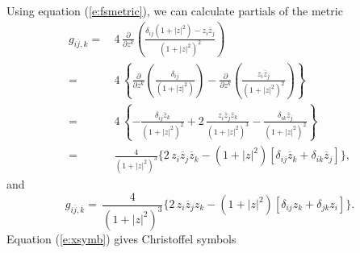 Using equation (\ref{e:fsmetric}), we can calculate partials of the metric 
\begin{equation}
\begin{split}
    g_{i\overline{j},k} =&\,4\, \frac{\partial}{\partial z^k} 
            \left(
                 \frac{\delta_{ij}\left( 1 + \left| z \right|^2 \right) - z_i\overline{z}_j }
                      { \left( 1 + \left| z\right|^2 \right)^2 }
            \right)\\
        =&\,4\, \left\lbrace
            \frac{\partial}{\partial z^k} \left(
                \frac{\delta_{ij}}{ \left( 1 + \left| z\right|^2 \right) }
            \right)
            - \frac{\partial}{\partial z^k} \left(
                \frac{z_i\overline{z}_j}{ 
                    \left( 1 + \left| z\right|^2 \right)^2 
                }
            \right)
        \right\rbrace\\
        =&\,4\,\left\lbrace
            -\frac{\delta_{ij}\overline{z}_k}{ 
                \left( 1 + \left| z\right|^2 \right)^2 
             }
            +2\,\frac{z_i\overline{z}_j\overline{z}_k}{
                    \left( 1 + \left| z\right|^2 \right)^3 
             }
            -\frac{\delta_{ik}\overline{z}_j}{ 
                \left( 1 + \left| z\right|^2 \right)^2 
             }
        \right\rbrace\\
        =&\,\frac{4}{
                \left( 1 + \left| z\right|^2 \right)^3 
            }
            \biggl\lbrace
                2\,z_i\overline{z}_j\overline{z}_k
                - \left( 1 + \left| z\right|^2 \right) \left[
                    \delta_{ij}\overline{z}_k 
                    + \delta_{ik}\overline{z}_j 
                \right]
            \biggr\rbrace,
\end{split}
\end{equation}
and
\begin{equation}
    g_{i\overline{j},\overline{k}} 
        =\,\frac{4}{
                \left( 1 + \left| z\right|^2 \right)^3 
            }
            \biggl\lbrace
                2\,z_i\overline{z}_jz_k
                - \left( 1 + \left| z\right|^2 \right) \left[
                    \delta_{ij}z_k 
                    + \delta_{jk}z_i 
                \right]
            \biggr\rbrace.
\end{equation}
Equation (\ref{e:xsymb}) gives Christoffel symbols
